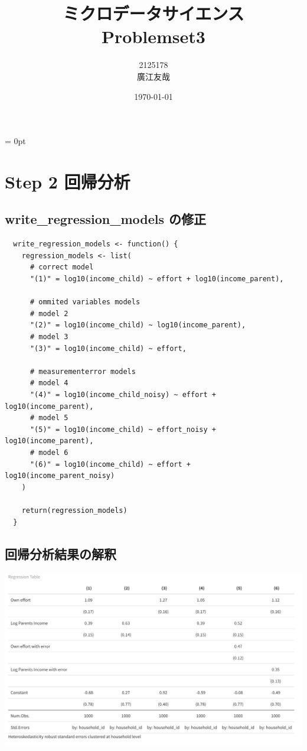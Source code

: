 \documentclass{article}
\begin{document}
\parindent = 0pt

\title{ミクロデータサイエンス\\Problemset3}
\author{2125178\\廣江友哉}
\date{\today}
\maketitle


\section{Step 2 回帰分析}

\subsection{write\_regression\_models の修正}

\begin{lstlisting}
  write_regression_models <- function() {
    regression_models <- list(
      # correct model
      "(1)" = log10(income_child) ~ effort + log10(income_parent),

      # ommited variables models
      # model 2
      "(2)" = log10(income_child) ~ log10(income_parent),
      # model 3
      "(3)" = log10(income_child) ~ effort,

      # measurementerror models
      # model 4
      "(4)" = log10(income_child_noisy) ~ effort + log10(income_parent),
      # model 5
      "(5)" = log10(income_child) ~ effort_noisy + log10(income_parent),
      # model 6
      "(6)" = log10(income_child) ~ effort + log10(income_parent_noisy)
    )

    return(regression_models)
  }
\end{lstlisting}

\subsection{回帰分析結果の解釈}

\includegraphics[width=18cm]{regression_table.png}
\end{document}
